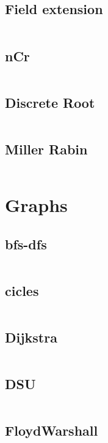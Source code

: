\documentclass[10pt]{article}
\begin{document}
				\subsection{Field extension}
					\inputminted[tabsize=2,breaklines,fontsize=\small]{c++}{DataStructures/EX.cpp}
				\subsection{nCr}
					\inputminted[tabsize=2,breaklines,fontsize=\small]{c++}{Math/nCr.cpp}
				\subsection{Discrete Root}
					\inputminted[tabsize=2,breaklines,fontsize=\small]{c++}{Math/discreteRoot.cpp}
				\subsection{Miller Rabin}
					\inputminted[tabsize=2,breaklines,fontsize=\small]{c++}{Math/MillerRabin.cpp}
			\section{Graphs}
				\subsection{bfs-dfs}
					\inputminted[tabsize=2,breaklines,fontsize=\small]{c++}{Graph/bfs-dfs.cpp}
				\subsection{cicles}
					\inputminted[tabsize=2,breaklines,fontsize=\small]{c++}{Graph/cicleAndBipartite.cpp}
				\subsection{Dijkstra}
					\inputminted[tabsize=2,breaklines,fontsize=\small]{c++}{Graph/dijkstra.cpp}
				\subsection{DSU}
					\inputminted[tabsize=2,breaklines,fontsize=\small]{c++}{Graph/DSU.cpp}
				\subsection{FloydWarshall}
					\inputminted[tabsize=2,breaklines,fontsize=\small]{c++}{Graph/floydWarshall.cpp}
\end{document}
